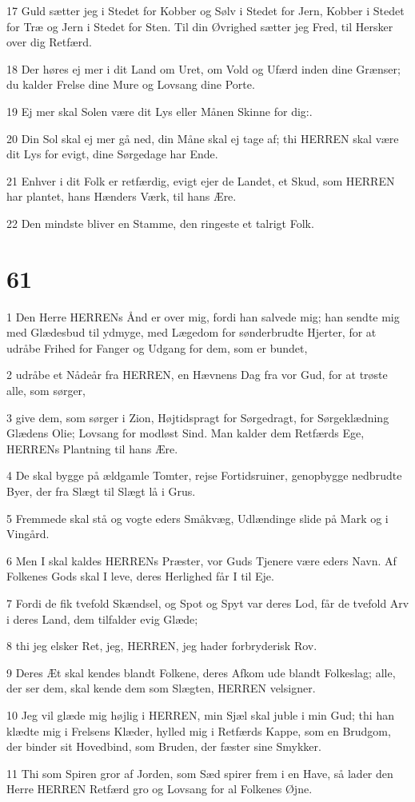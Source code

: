 \par 17 Guld sætter jeg i Stedet for Kobber og Sølv i Stedet for Jern, Kobber i Stedet for Træ og Jern i Stedet for Sten. Til din Øvrighed sætter jeg Fred, til Hersker over dig Retfærd.
\par 18 Der høres ej mer i dit Land om Uret, om Vold og Ufærd inden dine Grænser; du kalder Frelse dine Mure og Lovsang dine Porte.
\par 19 Ej mer skal Solen være dit Lys eller Månen Skinne for dig:.
\par 20 Din Sol skal ej mer gå ned, din Måne skal ej tage af; thi HERREN skal være dit Lys for evigt, dine Sørgedage har Ende.
\par 21 Enhver i dit Folk er retfærdig, evigt ejer de Landet, et Skud, som HERREN har plantet, hans Hænders Værk, til hans Ære.
\par 22 Den mindste bliver en Stamme, den ringeste et talrigt Folk.

\chapter{61}

\par 1 Den Herre HERRENs Ånd er over mig, fordi han salvede mig; han sendte mig med Glædesbud til ydmyge, med Lægedom for sønderbrudte Hjerter, for at udråbe Frihed for Fanger og Udgang for dem, som er bundet,
\par 2 udråbe et Nådeår fra HERREN, en Hævnens Dag fra vor Gud, for at trøste alle, som sørger,
\par 3 give dem, som sørger i Zion, Højtidspragt for Sørgedragt, for Sørgeklædning Glædens Olie; Lovsang for modløst Sind. Man kalder dem Retfærds Ege, HERRENs Plantning til hans Ære.
\par 4 De skal bygge på ældgamle Tomter, rejse Fortidsruiner, genopbygge nedbrudte Byer, der fra Slægt til Slægt lå i Grus.
\par 5 Fremmede skal stå og vogte eders Småkvæg, Udlændinge slide på Mark og i Vingård.
\par 6 Men I skal kaldes HERRENs Præster, vor Guds Tjenere være eders Navn. Af Folkenes Gods skal I leve, deres Herlighed får I til Eje.
\par 7 Fordi de fik tvefold Skændsel, og Spot og Spyt var deres Lod, får de tvefold Arv i deres Land, dem tilfalder evig Glæde;
\par 8 thi jeg elsker Ret, jeg, HERREN, jeg hader forbryderisk Rov.
\par 9 Deres Æt skal kendes blandt Folkene, deres Afkom ude blandt Folkeslag; alle, der ser dem, skal kende dem som Slægten, HERREN velsigner.
\par 10 Jeg vil glæde mig højlig i HERREN, min Sjæl skal juble i min Gud; thi han klædte mig i Frelsens Klæder, hylled mig i Retfærds Kappe, som en Brudgom, der binder sit Hovedbind, som Bruden, der fæster sine Smykker.
\par 11 Thi som Spiren gror af Jorden, som Sæd spirer frem i en Have, så lader den Herre HERREN Retfærd gro og Lovsang for al Folkenes Øjne.

